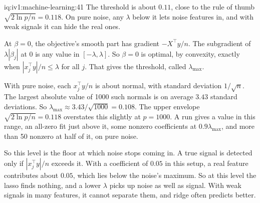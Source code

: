 \begin{solution}{iq:iv1:machine-learning:41}
The threshold is about $0.11$, close to the rule of thumb $\sqrt{2\ln p/n} = 0.118$. On pure noise, any $\lambda$ below it lets noise features in, and with weak signals it can hide the real ones.

At $\beta = 0$, the objective's smooth part has gradient $-X^\top y/n$. The subgradient of $\lambda|\beta_j|$ at 0 is any value in $[-\lambda, \lambda]$. So $\beta = 0$ is optimal, by convexity, exactly when $|x_j^\top y|/n \le \lambda$ for all $j$. That gives the threshold, called $\lambda_{\max}$.

With pure noise, each $x_j^\top y/n$ is about normal, with standard deviation $1/\sqrt{n}$. The largest absolute value of 1000 such normals is on average $3.43$ standard deviations. So $\lambda_{\max} \approx 3.43/\sqrt{1000} = 0.108$. The upper envelope $\sqrt{2\ln p/n} = 0.118$ overstates this slightly at $p = 1000$. A run gives a value in this range, an all-zero fit just above it, some nonzero coefficients at $0.9\lambda_{\max}$, and more than 50 nonzero at half of it, on pure noise.

So this level is the floor at which noise stops coming in. A true signal is detected only if $|x_j^\top y|/n$ exceeds it. With a coefficient of $0.05$ in this setup, a real feature contributes about $0.05$, which lies below the noise's maximum. So at this level the lasso finds nothing, and a lower $\lambda$ picks up noise as well as signal. With weak signals in many features, it cannot separate them, and ridge often predicts better.



\end{solution}

